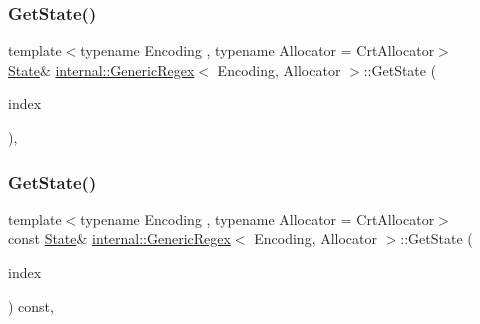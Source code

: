 \mbox{\label{classinternal_1_1GenericRegex_a25b5411bf4c332cba932006712d50ab7}} 
\subsubsection{\texorpdfstring{Get\+State()}{GetState()}\hspace{0.1cm}{\footnotesize\ttfamily [1/2]}}
{\footnotesize\ttfamily template$<$typename Encoding , typename Allocator  = Crt\+Allocator$>$ \\
\hyperlink{structinternal_1_1GenericRegex_1_1State}{State}\& \hyperlink{classinternal_1_1GenericRegex}{internal\+::\+Generic\+Regex}$<$ Encoding, Allocator $>$\+::Get\+State (\begin{DoxyParamCaption}\item[{\hyperlink{rapidjson_8h_a5ed6e6e67250fadbd041127e6386dcb5}{Size\+Type}}]{index }\end{DoxyParamCaption})\hspace{0.3cm}{\ttfamily [inline]}, {\ttfamily [private]}}

\mbox{\label{classinternal_1_1GenericRegex_a5c489eebc2f2fa12866029de0a3f0a01}} 
\subsubsection{\texorpdfstring{Get\+State()}{GetState()}\hspace{0.1cm}{\footnotesize\ttfamily [2/2]}}
{\footnotesize\ttfamily template$<$typename Encoding , typename Allocator  = Crt\+Allocator$>$ \\
const \hyperlink{structinternal_1_1GenericRegex_1_1State}{State}\& \hyperlink{classinternal_1_1GenericRegex}{internal\+::\+Generic\+Regex}$<$ Encoding, Allocator $>$\+::Get\+State (\begin{DoxyParamCaption}\item[{\hyperlink{rapidjson_8h_a5ed6e6e67250fadbd041127e6386dcb5}{Size\+Type}}]{index }\end{DoxyParamCaption}) const\hspace{0.3cm}{\ttfamily [inline]}, {\ttfamily [private]}}

